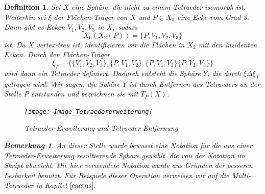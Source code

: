 \documentclass[12pt,titlepage,twoside,cleardoublepage]{article}
\theoremstyle{nummermitklammern}
\newtheorem{definition}[temp]{Definition}
\newtheorem{bemerkung}[temp]{Bemerkung}
\newtheorem{definition}[zahl]{Definition}
\newtheorem{bemerkung}[zahl]{Bemerkung}
\numberwithin{equation}{section}
\begin{document}
\begin{definition}
Sei $X$ eine Sphäre, die nicht zu einem Tetraeder isomorph ist.
Weiterhin sei $\xi$ der Flächen-Träger von $X$ und $P\in X_0$ eine Ecke vom Grad 3. Dann gibt es Ecken $V_1,V_2,V_3$ in $X,$ sodass
\[
X_0(X_2(P))=\{P,V_1,V_2,V_3\}
\] 
ist. Da $X$ vertex-treu ist, identifizieren wir die Flächen in $X_2$  mit den inzidenten Ecken. Durch den Flächen-Träger 
\[
\xi_T=\{\{V_1,V_2,V_3\},\{P,V_1,V_2\},\{P,V_1,V_3\}\{P,V_2,V_3\}\}
\]
 wird dann ein Tetraeder definiert. 
  Dadurch entsteht die Sphäre $Y$, die durch $\xi \Delta \xi_T$ getragen wird. Wir sagen, die Sphäre $Y$ ist durch Entfernen des Tetraeders an der Stelle $P$ entstanden und bezeichnen sie mit $T_P(X)$.
\begin{figure}[H]
\begin{center}
\texttt{[image: Image\_Tetraedererweiterung]}
\end{center}
\caption{Tetraeder-Erweiterung und Tetraeder-Entfernung}
\end{figure}
\begin{bemerkung}
An dieser Stelle wurde bewusst eine Notation für die aus einer Tetraeder-Erweiterung resultierende Sphäre gewählt, die von der Notation im Skript abweicht. Die hier verwendete Notation wurde aus Gründen der besseren Lesbarkeit benutzt. Für Beispiele dieser Operation verweisen wir auf die Multi-Tetraeder in Kapitel $\ref{cactus}$.
\end{bemerkung}
\end{definition}
\end{document}

